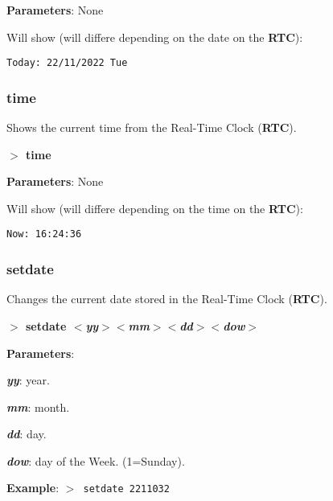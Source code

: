         \textbf{Parameters}: None

        Will show (will differe depending on the date on the \textbf{RTC}):

        \hspace{1cm}\texttt{Today:\ 22/11/2022 Tue}

        \subsubsection{{time}}
        Shows the current time from the Real-Time Clock (\textbf{RTC}).

        \hspace{1.9cm}\textbf{$>$ time}

        \textbf{Parameters}: None

        Will show (will differe depending on the time on the \textbf{RTC}):

        \hspace{1cm}\texttt{Now:\ 16:24:36}

        \subsubsection{{setdate}}
        Changes the current date stored in the Real-Time Clock (\textbf{RTC}).

        \hspace{1.9cm}\textbf{$>$ setdate \textit{$<$yy$>$$<$mm$>$$<$dd$>$$<$dow$>$}}

        \textbf{Parameters}:

        \hspace{1cm}\textbf{\textit{yy}}: year.

        \hspace{1cm}\textbf{\textit{mm}}: month.

        \hspace{1cm}\textbf{\textit{dd}}: day.

        \hspace{1cm}\textbf{\textit{dow}}: day of the Week. (1=Sunday).

        \textbf{Example}: \texttt{$>$ setdate 2211032}

